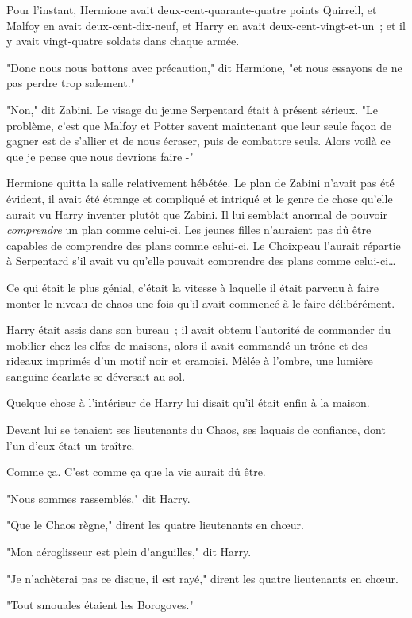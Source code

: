 Pour l'instant, Hermione avait deux-cent-quarante-quatre points Quirrell, et Malfoy en avait deux-cent-dix-neuf, et Harry en avait deux-cent-vingt-et-un~; et il y avait vingt-quatre soldats dans chaque armée.

"Donc nous nous battons avec précaution," dit Hermione, "et nous essayons de ne pas perdre trop salement."

"Non," dit Zabini. Le visage du jeune Serpentard était à présent sérieux. "Le problème, c'est que Malfoy et Potter savent maintenant que leur seule façon de gagner est de s'allier et de nous écraser, puis de combattre seuls. Alors voilà ce que je pense que nous devrions faire -"

Hermione quitta la salle relativement hébétée. Le plan de Zabini n'avait pas été évident, il avait été étrange et compliqué et intriqué et le genre de chose qu'elle aurait vu Harry inventer plutôt que Zabini. Il lui semblait anormal de pouvoir \emph{comprendre} un plan comme celui-ci. Les jeunes filles n'auraient pas dû être capables de comprendre des plans comme celui-ci. Le Choixpeau l'aurait répartie à Serpentard s'il avait vu qu'elle pouvait comprendre des plans comme celui-ci…

\later

Ce qui était le plus génial, c'était la vitesse à laquelle il était parvenu à faire monter le niveau de chaos une fois qu'il avait commencé à le faire délibérément.

Harry était assis dans son bureau~; il avait obtenu l'autorité de commander du mobilier chez les elfes de maisons, alors il avait commandé un trône et des rideaux imprimés d'un motif noir et cramoisi. Mêlée à l'ombre, une lumière sanguine écarlate se déversait au sol.

Quelque chose à l'intérieur de Harry lui disait qu'il était enfin à la maison.

Devant lui se tenaient ses lieutenants du Chaos, ses laquais de confiance, dont l'un d'eux était un traître.

Comme ça. C'est comme ça que la vie aurait dû être.

"Nous sommes rassemblés," dit Harry.

"Que le Chaos règne," dirent les quatre lieutenants en chœur.

"Mon aéroglisseur est plein d'anguilles," dit Harry.

"Je n'achèterai pas ce disque, il est rayé," dirent les quatre lieutenants en chœur.

"Tout smouales étaient les Borogoves."

